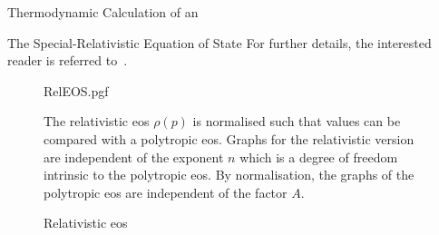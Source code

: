 \begin{section}{Thermodynamic Calculation of an \texorpdfstring{}{EoS}}
\begin{subsection}{The Special-Relativistic Equation of State}
For further details, the interested reader is referred to~\cite{pleyerGithubRepositoryJonas2021}.
\begin{figure}[H]
	{\centering
	{RelEOS.pgf}
	}
	\caption{Relativistic \acl{eos}}
	\label{fig:2-IntEner-RelEOSPlot}
	\small
	The relativistic \ac{eos} $\rho(p)$ is normalised such that values can be compared with a polytropic \ac{eos}.
	Graphs for the relativistic version are independent of the exponent $n$ which is a degree of freedom intrinsic to the polytropic \ac{eos}.
	By normalisation, the graphs of the polytropic \ac{eos} are independent of the factor $A$.
\end{figure}
\end{subsection}
%
%
%
%
%
%
\end{section}